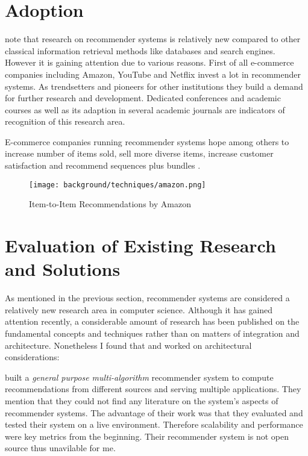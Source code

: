 \section{Adoption}
\label{bg-adoption}

\citet{ricci11} note that research on recommender systems is relatively new compared to other classical information retrieval methods like databases and search engines. However it is gaining attention due to various reasons. First of all e-commerce companies including Amazon, YouTube and Netflix invest a lot in recommender systems. As trendsetters and pioneers for other institutions they build a demand for further research and development. Dedicated conferences and academic courses as well as its adaption in several academic journals are indicators of recognition of this research area.

E-commerce companies running recommender systems hope among others to increase number of items sold, sell more diverse items, increase customer satisfaction and recommend sequences plus bundles \cite{herlocker04}.

\begin{figure}[ht]
    \texttt{[image: background/techniques/amazon.png]}
    \caption{Item-to-Item Recommendations by Amazon}
    \label{fig:itembased-amazon}
\end{figure}



\section{Evaluation of Existing Research and Solutions}
\label{prob-evaluation}

As mentioned in the previous section, recommender systems are considered a relatively new research area in computer science. Although it has gained attention recently, a considerable amount of research has been published on the fundamental concepts and techniques rather than on matters of integration and architecture. Nonetheless I found that \citet{cortizo10} and \citet{rack07} worked on architectural considerations:

\citet{cortizo10} built a \textit{general purpose multi-algorithm} recommender system to compute recommendations from different sources and serving multiple applications. They mention that they could not find any literature on the system's aspects of recommender systems. The advantage of their work was that they evaluated and tested their system on a live environment. Therefore scalability and performance were key metrics from the beginning. Their recommender system is not open source thus unavilable for me.

